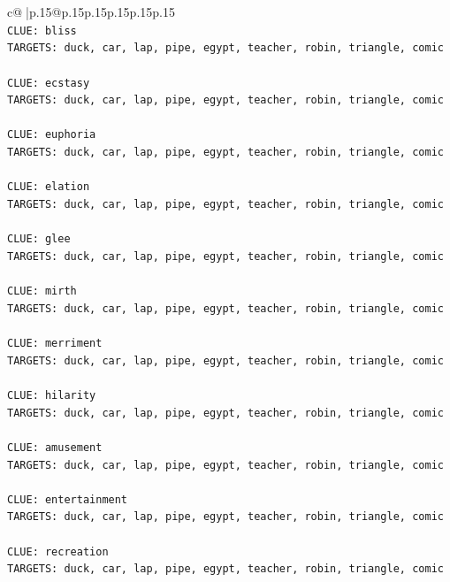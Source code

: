 \documentclass{article}
\begin{document}
{\begin{supertabular}{c@{$\;$}|p{.15\linewidth}@{}p{.15\linewidth}p{.15\linewidth}p{.15\linewidth}p{.15\linewidth}p{.15\linewidth}}
{{{\\ 
\texttt{CLUE: bliss} \\
\texttt{TARGETS: duck, car, lap, pipe, egypt, teacher, robin, triangle, comic} \\
\\ 
\texttt{CLUE: ecstasy} \\
\texttt{TARGETS: duck, car, lap, pipe, egypt, teacher, robin, triangle, comic} \\
\\ 
\texttt{CLUE: euphoria} \\
\texttt{TARGETS: duck, car, lap, pipe, egypt, teacher, robin, triangle, comic} \\
\\ 
\texttt{CLUE: elation} \\
\texttt{TARGETS: duck, car, lap, pipe, egypt, teacher, robin, triangle, comic} \\
\\ 
\texttt{CLUE: glee} \\
\texttt{TARGETS: duck, car, lap, pipe, egypt, teacher, robin, triangle, comic} \\
\\ 
\texttt{CLUE: mirth} \\
\texttt{TARGETS: duck, car, lap, pipe, egypt, teacher, robin, triangle, comic} \\
\\ 
\texttt{CLUE: merriment} \\
\texttt{TARGETS: duck, car, lap, pipe, egypt, teacher, robin, triangle, comic} \\
\\ 
\texttt{CLUE: hilarity} \\
\texttt{TARGETS: duck, car, lap, pipe, egypt, teacher, robin, triangle, comic} \\
\\ 
\texttt{CLUE: amusement} \\
\texttt{TARGETS: duck, car, lap, pipe, egypt, teacher, robin, triangle, comic} \\
\\ 
\texttt{CLUE: entertainment} \\
\texttt{TARGETS: duck, car, lap, pipe, egypt, teacher, robin, triangle, comic} \\
\\ 
\texttt{CLUE: recreation} \\
\texttt{TARGETS: duck, car, lap, pipe, egypt, teacher, robin, triangle, comic} \\
\\ 
}}}
\end{supertabular}}
\end{document}
